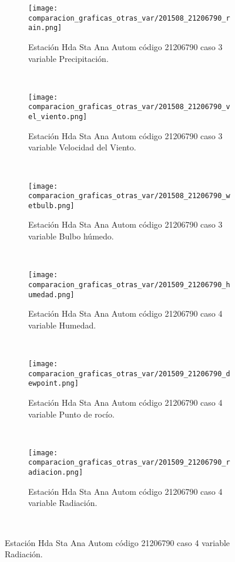 \begin{figure}[H]
\centering
\begin{subfigure}[normla]{0.4\textwidth}
\caption{Estación Hda Sta Ana Autom código 21206790 caso 3 variable Precipitación.}
\texttt{[image: comparacion\_graficas\_otras\_var/201508\_21206790\_rain.png]}
\end{subfigure}
~
\begin{subfigure}[normla]{0.4\textwidth}
\caption{Estación Hda Sta Ana Autom código 21206790 caso 3 variable Velocidad del Viento.}
\texttt{[image: comparacion\_graficas\_otras\_var/201508\_21206790\_vel\_viento.png]}
\end{subfigure}
~
\begin{subfigure}[normla]{0.4\textwidth}
\caption{Estación Hda Sta Ana Autom código 21206790 caso 3 variable Bulbo húmedo.}
\texttt{[image: comparacion\_graficas\_otras\_var/201508\_21206790\_wetbulb.png]}
\end{subfigure}
~
\begin{subfigure}[normla]{0.4\textwidth}
\caption{Estación Hda Sta Ana Autom código 21206790 caso 4 variable Humedad.}
\texttt{[image: comparacion\_graficas\_otras\_var/201509\_21206790\_humedad.png]}
\end{subfigure}
~
\begin{subfigure}[normla]{0.4\textwidth}
\caption{Estación Hda Sta Ana Autom código 21206790 caso 4 variable Punto de rocío.}
\texttt{[image: comparacion\_graficas\_otras\_var/201509\_21206790\_dewpoint.png]}
\end{subfigure}
~
\begin{subfigure}[normla]{0.4\textwidth}
\caption{Estación Hda Sta Ana Autom código 21206790 caso 4 variable Radiación.}
\texttt{[image: comparacion\_graficas\_otras\_var/201509\_21206790\_radiacion.png]}
\end{subfigure}
~
\end{figure}
           
